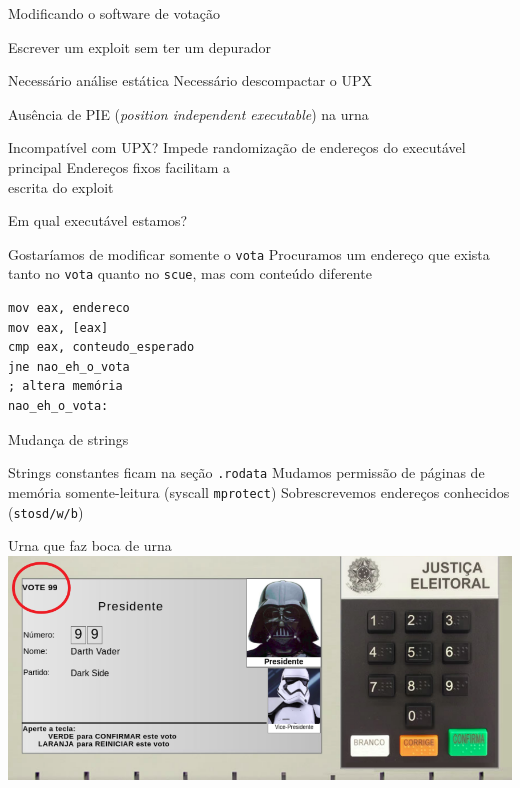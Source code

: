 \documentclass[14pt]{beamer}
\begin{document}
\begin{frame}{Modificando o software de votação}
  \begin{fullpageitemize}
    \itemR Escrever um exploit sem ter um depurador
      \begin{itemize}
        \itemR Necessário análise estática
        \itemR Necessário descompactar o UPX
      \end{itemize}
    \itemR Ausência de PIE (\textit{position independent executable}) na urna
      \begin{itemize}
        \itemR Incompatível com UPX?
        \itemR Impede randomização de endereços do executável principal
        \itemR Endereços fixos facilitam a \\escrita do exploit
      \end{itemize}
  \end{fullpageitemize}
\end{frame}

\begin{frame}[fragile]{Em qual executável estamos?}
  \begin{fullpageitemize}
    \itemR Gostaríamos de modificar somente o \texttt{vota}
    \itemR Procuramos um endereço que exista tanto no \texttt{vota} quanto no \texttt{scue}, mas com conteúdo diferente
    \begin{verbatim}
mov eax, endereco
mov eax, [eax]
cmp eax, conteudo_esperado
jne nao_eh_o_vota
; altera memória
nao_eh_o_vota:
    \end{verbatim}
  \end{fullpageitemize}
\end{frame}

\begin{frame}{Mudança de strings}
  \begin{fullpageitemize}
    \itemR Strings constantes ficam na seção \texttt{.rodata}
    \itemR Mudamos permissão de páginas de memória somente-leitura (syscall \texttt{mprotect})
    \itemR Sobrescrevemos endereços conhecidos (\texttt{stosd/w/b})
  \end{fullpageitemize}
\end{frame}

\begin{frame}{Urna que faz boca de urna}
  \vfill
  {\centering
  \includegraphics[width=\textwidth,height=0.90\textheight,keepaspectratio]{images/vote99}}
  \vfill
\end{frame}
\end{document}
